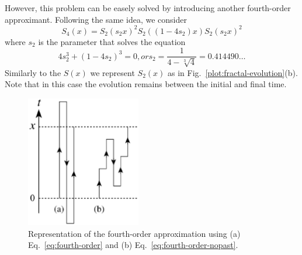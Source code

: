 However, this problem can be easely solved by introducing another fourth-order approximant. Following the same idea, we consider
\begin{equation} \label{eq:fourth-order-nopast}
S_4(x) = S_2(s_2x)^2 S_2((1-4s_2)x) S_2(s_2x)^2	
\end{equation}
where $s_2$ is the parameter that solves the equation
\begin{equation}
4s_2^3 + (1-4s_2)^3 = 0, or s_2 = \frac{1}{4 - \sqrt[3]{4}}=0.414490\ldots
\end{equation}
Similarly to the $S(x)$ we represent $S_2(x)$ as in Fig.~\ref{plot:fractal-evolution}(b). Note that in this case the evolution remains between the initial and final time.
\begin{figure}
   \centering
   \includegraphics[width=5cm]{Plots/evolution.eps}
   \caption{Representation of the fourth-order approximation using (a) Eq.~\eqref{eq:fourth-order} and (b) Eq.~\eqref{eq:fourth-order-nopast}.} \label{plot:evolution}
\end{figure}


